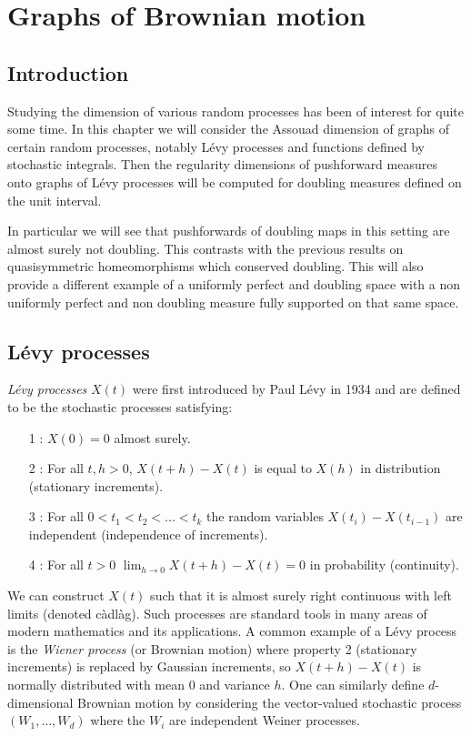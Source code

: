 \chapter{Graphs of Brownian motion}
\label{chap:graphs}

\section{Introduction}
\label{sec:intro-brownian}

Studying the dimension of various random processes has been of interest for quite some time. In this chapter we will consider the Assouad dimension of graphs of certain random processes, notably L\'evy processes and functions defined by stochastic integrals. Then the regularity dimensions of pushforward measures onto graphs of L\'evy processes will be computed for doubling measures defined on the unit interval. 

In particular we will see that pushforwards of doubling maps in this setting are almost surely not doubling. This contrasts with the previous results on quasisymmetric homeomorphisms which conserved doubling. This will also provide a different example of a uniformly perfect and doubling space with a non uniformly perfect and non doubling measure fully supported on that same space.

\section{L\'evy processes}
\label{sec:levy-process}


\emph{L\'{e}vy processes} $X(t)$ were first introduced by Paul L\'evy in 1934 \cite{Le} and are defined to be the stochastic processes satisfying:
\begin{itemize}
	\item[1]: $X(0)=0$ almost surely.
	\item[2]: For all $t,h>0$, $X(t+h)-X(t)$ is equal to $X(h)$ in distribution (stationary increments).
	\item[3]: For all $0<t_1<t_2<...<t_k$ the random variables $X(t_i)-X(t_{i-1})$ are independent (independence of increments).
	\item[4]: For all $t>0$ $\lim_{h\to 0} X(t+h)-X(t)=0$ in probability (continuity).
\end{itemize}
We can construct $X(t)$ such that it is almost surely right continuous with left limits (denoted c\`adl\`ag). Such processes are standard tools in many areas of modern mathematics and its applications. A common example of a L\'evy process is the \emph{Wiener process} (or Brownian motion) where property 2 (stationary increments) is replaced by Gaussian increments, so $X(t+h)-X(t)$ is normally distributed with mean 0 and variance $h$. One can similarly define $d$-dimensional Brownian motion by considering the vector-valued stochastic process $(W_1,\ldots, W_d)$ where the $W_i$ are independent Weiner processes. 

